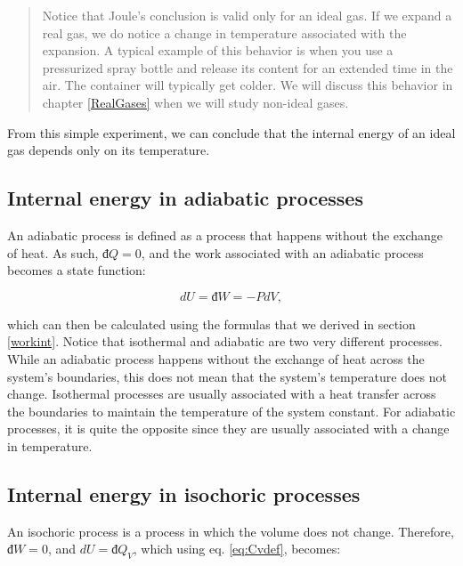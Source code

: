 \documentclass[
  9pt,
]{extbook}
\theoremstyle{definition}
\theoremstyle{definition}
\theoremstyle{definition}
\theoremstyle{remark}
\begin{document}
\begin{quote}
Notice that Joule's conclusion is valid only for an ideal gas. If we expand a real gas, we do notice a change in temperature associated with the expansion. A typical example of this behavior is when you use a pressurized spray bottle and release its content for an extended time in the air. The container will typically get colder. We will discuss this behavior in chapter \ref{RealGases} when we will study non-ideal gases.
\end{quote}

From this simple experiment, we can conclude that the internal energy of an ideal gas depends only on its temperature.

\hypertarget{internal-energy-in-adiabatic-processes}{%
\subsection{Internal energy in adiabatic processes}\label{internal-energy-in-adiabatic-processes}}

An adiabatic process is defined as a process that happens without the exchange of heat. As such, \(đ Q=0\), and the work associated with an adiabatic process becomes a state function:

\begin{equation}
  dU=đ W=-PdV,
  \label{eq:dUadiabatic}
\end{equation}

which can then be calculated using the formulas that we derived in section \ref{workint}. Notice that isothermal and adiabatic are two very different processes. While an adiabatic process happens without the exchange of heat across the system's boundaries, this does not mean that the system's temperature does not change. Isothermal processes are usually associated with a heat transfer across the boundaries to maintain the temperature of the system constant. For adiabatic processes, it is quite the opposite since they are usually associated with a change in temperature.

\hypertarget{internal-energy-in-isochoric-processes}{%
\subsection{Internal energy in isochoric processes}\label{internal-energy-in-isochoric-processes}}

An isochoric process is a process in which the volume does not change. Therefore, \(đ W=0\), and \(dU = đ Q_V\), which using eq. \eqref{eq:Cvdef}, becomes:
\end{document}
